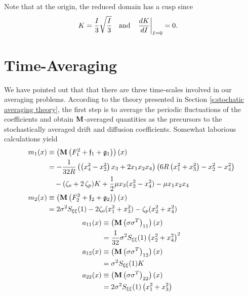 Note that at the origin, the reduced domain has a cusp since
\begin{align*}
K &= \frac{I}{3}\sqrt{\frac{I}{3}} & \text{and}&&\eval{\frac{dK}{dI}}_{I=0} &= 0.
\end{align*}

\section{Time-Averaging}
\label{S:T-Average}

We have pointed out that that there are three time-scales involved in our averaging problems. According to the theory presented in Section \ref{s:stochatic averaging theory}, the first step is to average the periodic fluctuations of the coefficients and obtain $\operatorname{\mathbf M}$-averaged quantities as the precursors to the stochastically averaged drift and diffusion coefficients. Somewhat laborious calculations yield
\begin{equation}
\begin{aligned}
m_1(x) &\equiv \left(\operatorname{\mathbf M} \left(F_1^2 + \mathfrak{f}_1 + \mathfrak{g}_1\right)\right)(x)\\
&=-\frac{1}{32R}\left( \left(x_4^2-x_2^2 \right)x_3+2 x_1 x_2 x_4\right)\left(6R\left( x_1^2+x_3^2 \right)-x_2^2-x_4^2\right) \\
&\quad -(\zeta_o+2\,\zeta_p) K +\frac12\mu x_3(x_2^2-x_4^2) - \mu x_1x_2x_4\\
m_2(x)&\equiv\left(\operatorname{\mathbf M} \left(F_2^2 + \mathfrak{f}_2 + \mathfrak{g}_2\right)\right)(x)\\
&= 2 \sigma^2S_{\xi\xi}(1) -2\zeta_o(x_1^2+x_3^2) - \zeta_p(x_2^2 + x_4^2)
\end{aligned}
\label{E:drift1}
\end{equation}
\begin{equation}
\begin{aligned}
a_{11}(x) &\equiv \left(\operatorname{\mathbf M} \left(\sigma\sigma^T\right)_{11}\right)(x)\\
&= \frac{1}{32}\sigma^2S_{\xi\xi}(1)\left(x_2^2 + x_4^2\right)^2\\
a_{12}(x) &\equiv \left(\operatorname{\mathbf M} \left(\sigma\sigma^T\right)_{12}\right)(x)\\
&= \sigma^2S_{\xi\xi}(1) K\\
a_{22}(x) &\equiv \left(\operatorname{\mathbf M} \left(\sigma\sigma^T\right)_{22}\right)(x)\\
&= 2\sigma^2S_{\xi\xi}(1)\left(x_1^2+x_3^2\right)
\end{aligned}
\label{E:diffusion1}
\end{equation}
